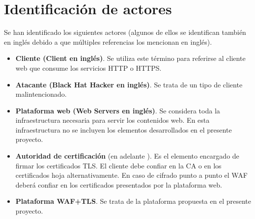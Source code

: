 \section{Identificación de actores}
\par Se han identificado los siguientes actores (algunos de ellos se identifican también en inglés debido a que múltiples referencias los mencionan en inglés).
\begin{itemize}
  \item {\bf Cliente (Client en inglés)}. Se utiliza este término para referirse al cliente web que consume los servicios HTTP o HTTPS.
  \item {\bf \Gls{Atacante} (Black Hat Hacker en inglés)}. Se trata de un tipo de cliente malintencionado.
  \item {\bf Plataforma web (Web Servers en inglés)}. Se considera toda la infraestructura necesaria para servir los contenidos web. En esta infraestructura no
    se incluyen los elementos desarrollados en el presente proyecto.
  \item {\bf Autoridad de certificación} (en adelante ). Es el elemento encargado de firmar los certificados TLS. El cliente debe confiar en la CA o en los certificados hoja alternativamente. En caso de cifrado punto a punto el WAF deberá confiar en los certificados presentados por la plataforma web.
  \item {\bf Plataforma WAF+TLS}. Se trata de la plataforma propuesta en el presente proyecto.
\end{itemize}

\clearpage
